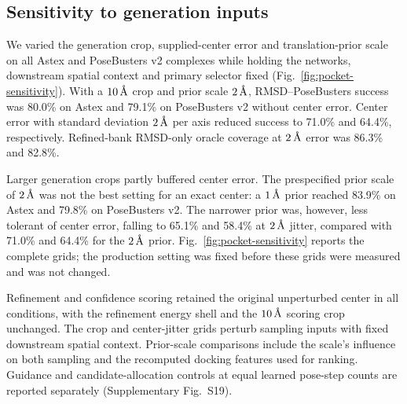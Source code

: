 \documentclass{article}
\newcommand{\angstrom}{\text{\normalfont\AA}}
\begin{document}
\subsection{Sensitivity to generation inputs}

We varied the generation crop, supplied-center error and translation-prior scale on all Astex and PoseBusters v2 complexes while holding the networks, downstream spatial context and primary selector fixed (Fig.~\ref{fig:pocket-sensitivity}). With a \(10\,\angstrom\) crop and prior scale \(2\,\angstrom\), RMSD--PoseBusters success was 80.0\% on Astex and 79.1\% on PoseBusters v2 without center error. Center error with standard deviation \(2\,\angstrom\) per axis reduced success to 71.0\% and 64.4\%, respectively. Refined-bank RMSD-only oracle coverage at \(2\,\angstrom\) error was 86.3\% and 82.8\%.

Larger generation crops partly buffered center error. The prespecified prior scale of \(2\,\angstrom\) was not the best setting for an exact center: a \(1\,\angstrom\) prior reached 83.9\% on Astex and 79.8\% on PoseBusters v2. The narrower prior was, however, less tolerant of center error, falling to 65.1\% and 58.4\% at \(2\,\angstrom\) jitter, compared with 71.0\% and 64.4\% for the \(2\,\angstrom\) prior. Fig.~\ref{fig:pocket-sensitivity} reports the complete grids; the production setting was fixed before these grids were measured and was not changed.

Refinement and confidence scoring retained the original unperturbed center in all conditions, with the refinement energy shell and the \(10\,\angstrom\) scoring crop unchanged. The crop and center-jitter grids perturb sampling inputs with fixed downstream spatial context. Prior-scale comparisons include the scale's influence on both sampling and the recomputed docking features used for ranking. Guidance and candidate-allocation controls at equal learned pose-step counts are reported separately (Supplementary Fig.~S19).
\end{document}
